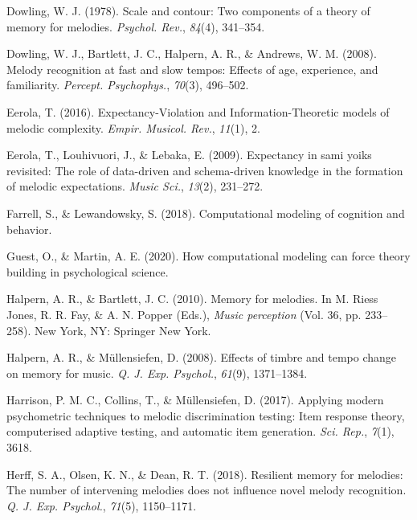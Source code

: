 \documentclass[english,man]{apa6}
\begin{document}
\leavevmode\hypertarget{ref-Dowling1978-ql}{}%
Dowling, W. J. (1978). Scale and contour: Two components of a theory of memory for melodies. \emph{Psychol. Rev.}, \emph{84}(4), 341--354.

\leavevmode\hypertarget{ref-Dowling2008-oz}{}%
Dowling, W. J., Bartlett, J. C., Halpern, A. R., \& Andrews, W. M. (2008). Melody recognition at fast and slow tempos: Effects of age, experience, and familiarity. \emph{Percept. Psychophys.}, \emph{70}(3), 496--502.

\leavevmode\hypertarget{ref-Eerola2016-ff}{}%
Eerola, T. (2016). Expectancy-Violation and Information-Theoretic models of melodic complexity. \emph{Empir. Musicol. Rev.}, \emph{11}(1), 2.

\leavevmode\hypertarget{ref-Eerola2009-qj}{}%
Eerola, T., Louhivuori, J., \& Lebaka, E. (2009). Expectancy in sami yoiks revisited: The role of data-driven and schema-driven knowledge in the formation of melodic expectations. \emph{Music Sci.}, \emph{13}(2), 231--272.

\leavevmode\hypertarget{ref-Farrell2018-qn}{}%
Farrell, S., \& Lewandowsky, S. (2018). Computational modeling of cognition and behavior.

\leavevmode\hypertarget{ref-Guest2020-jx}{}%
Guest, O., \& Martin, A. E. (2020). How computational modeling can force theory building in psychological science.

\leavevmode\hypertarget{ref-Halpern2010-cz}{}%
Halpern, A. R., \& Bartlett, J. C. (2010). Memory for melodies. In M. Riess Jones, R. R. Fay, \& A. N. Popper (Eds.), \emph{Music perception} (Vol. 36, pp. 233--258). New York, NY: Springer New York.

\leavevmode\hypertarget{ref-Halpern2008-vh}{}%
Halpern, A. R., \& Müllensiefen, D. (2008). Effects of timbre and tempo change on memory for music. \emph{Q. J. Exp. Psychol.}, \emph{61}(9), 1371--1384.

\leavevmode\hypertarget{ref-Harrison2017-us}{}%
Harrison, P. M. C., Collins, T., \& Müllensiefen, D. (2017). Applying modern psychometric techniques to melodic discrimination testing: Item response theory, computerised adaptive testing, and automatic item generation. \emph{Sci. Rep.}, \emph{7}(1), 3618.

\leavevmode\hypertarget{ref-Herff2018-ts}{}%
Herff, S. A., Olsen, K. N., \& Dean, R. T. (2018). Resilient memory for melodies: The number of intervening melodies does not influence novel melody recognition. \emph{Q. J. Exp. Psychol.}, \emph{71}(5), 1150--1171.
\end{document}
